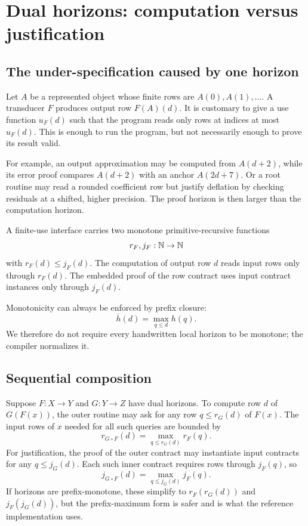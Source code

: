\section{Dual horizons: computation versus justification}
\label{sec:dual-horizons}

\subsection{The under-specification caused by one horizon}

Let \(A\) be a represented object whose finite rows are \(A(0),A(1),\ldots\).  A
transducer \(F\) produces output row \(F(A)(d)\).  It is customary to give a use
function \(u_F(d)\) such that the program reads only rows at indices at most
\(u_F(d)\).  This is enough to run the program, but not necessarily enough to prove
its result valid.

For example, an output approximation may be computed from \(A(d+2)\), while its error
proof compares \(A(d+2)\) with an anchor \(A(2d+7)\).  Or a root routine may read a
rounded coefficient row but justify deflation by checking residuals at a shifted,
higher precision.  The proof horizon is then larger than the computation horizon.

\begin{definition}
A finite-use interface carries two monotone primitive-recursive functions
\[
    r_F,j_F:\mathbb N\to\mathbb N
\]
with \(r_F(d)\le j_F(d)\).  The computation of output row \(d\) reads input rows only
through \(r_F(d)\).  The embedded proof of the row contract uses input contract
instances only through \(j_F(d)\).
\end{definition}

Monotonicity can always be enforced by prefix closure:
\[
    \overline h(d)=\max_{q\le d}h(q).
\]
We therefore do not require every handwritten local horizon to be monotone; the
compiler normalizes it.

\subsection{Sequential composition}

Suppose \(F:X\to Y\) and \(G:Y\to Z\) have dual horizons.  To compute row \(d\) of
\(G(F(x))\), the outer routine may ask for any row \(q\le r_G(d)\) of \(F(x)\).  The
input rows of \(x\) needed for all such queries are bounded by
\[
   r_{G\circ F}(d)
   =\max_{q\le r_G(d)}r_F(q).
\]
For justification, the proof of the outer contract may instantiate input contracts
for any \(q\le j_G(d)\).  Each such inner contract requires rows through \(j_F(q)\), so
\[
   j_{G\circ F}(d)
   =\max_{q\le j_G(d)}j_F(q).
\]
If horizons are prefix-monotone, these simplify to
\(r_F(r_G(d))\) and \(j_F(j_G(d))\), but the prefix-maximum form is safer and is what
the reference implementation uses.


